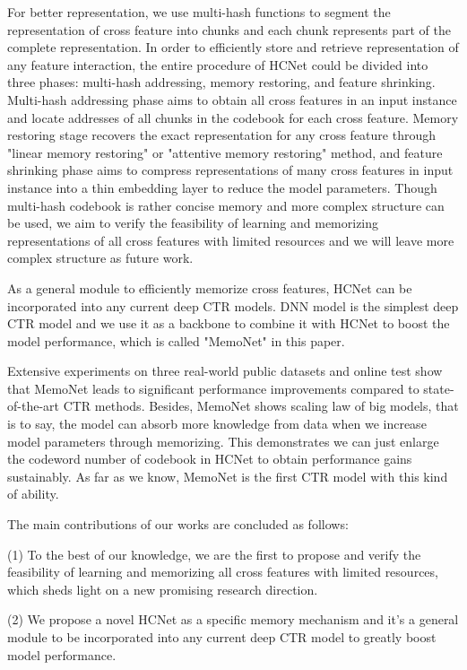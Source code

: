 \documentclass[sigconf,authorversion]{acmart}
\begin{document}
For better representation, we use multi-hash functions to segment the representation of cross feature into   chunks and each chunk represents part of the complete representation.  In order to efficiently store and retrieve representation of any feature interaction, the entire procedure of HCNet could be divided into three phases: multi-hash addressing, memory restoring, and feature shrinking. Multi-hash addressing phase aims to obtain all cross features in an input instance and locate addresses of all chunks in the codebook for each cross feature. Memory restoring stage recovers the exact representation for any cross feature through "linear memory restoring" or "attentive memory restoring" method, and feature shrinking phase aims to compress representations of many cross features in input instance into a thin embedding layer to reduce the model parameters. Though multi-hash codebook is rather concise memory and more complex structure can be used, we aim to verify the feasibility of learning and memorizing representations of all cross features with limited resources and we will leave more complex structure as future work.

As a general module to efficiently memorize cross features, HCNet can be incorporated into any current deep CTR models. DNN model is the simplest deep CTR model and we use it as a backbone to combine it with HCNet to boost the model performance, which is  called  "MemoNet" in this paper.

Extensive experiments on three real-world public datasets and online test show that MemoNet leads to significant performance improvements compared to state-of-the-art CTR methods. Besides, MemoNet shows scaling law of big models, that is to say, the model can absorb more knowledge from data when we increase model parameters through memorizing. This demonstrates we can just enlarge the codeword number of codebook in HCNet to obtain performance gains sustainably. As far as we know, MemoNet is the first CTR model with this kind of ability.

The main contributions of our works are concluded as follows:

(1) To the best of our knowledge, we are the first to propose and verify the feasibility of learning and memorizing all cross features  with limited resources, which sheds light on a new promising research direction.

(2) We propose a novel HCNet as a specific memory mechanism and it's a general module to be incorporated into any current
deep CTR model to greatly boost model performance.
\end{document}
